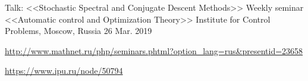 \begin{cventries}
\cventry
{Talk: <<Stochastic Spectral and Conjugate Descent Methods>>} %
{Weekly seminar <<Automatic control and Optimization Theory>>} %
{Institute for Control Problems, Moscow, Russia} %
{26 Mar. 2019} %
{ %
\begin{cvitems}
\item {\url{http://www.mathnet.ru/php/seminars.phtml?option_lang=rus&presentid=23658}}
\item {\url{https://www.ipu.ru/node/50794}}
\end{cvitems}
}


\end{cventries}